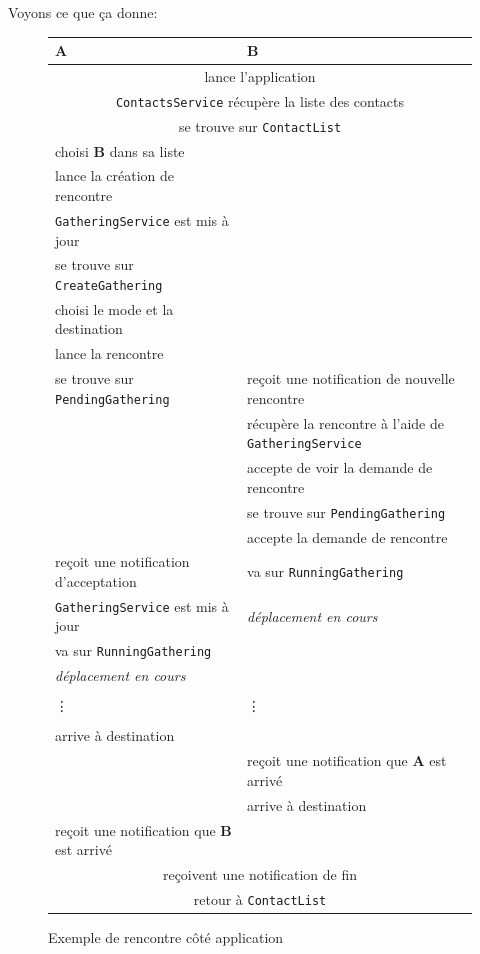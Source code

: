 \documentclass[french]{article}
\begin{document}
	Voyons ce que ça donne:
	\begin{figure}[H]
		\centering
		\begin{longtable}{|l|l|}
			\hline
			\textbf{A} & \textbf{B}\\
			\hline
			\multicolumn{2}{c}{lance l'application}\\
			\multicolumn{2}{c}{\texttt{ContactsService} récupère la liste des contacts}\\
			\multicolumn{2}{c}{se trouve sur \texttt{ContactList}}\\
			choisi \textbf{B} dans sa liste & \\
			lance la création de rencontre & \\
			\texttt{GatheringService} est mis à jour & \\
			se trouve sur \texttt{CreateGathering} & \\
			choisi le mode et la destination & \\
			lance la rencontre & \\
			se trouve sur \texttt{PendingGathering} & reçoit une notification de nouvelle rencontre\\
			& récupère la rencontre à l'aide de \texttt{GatheringService}\\
			& accepte de voir la demande de rencontre\\
			& se trouve sur \texttt{PendingGathering}\\
			& accepte la demande de rencontre\\
			reçoit une notification d'acceptation & va sur \texttt{RunningGathering}\\
			\texttt{GatheringService} est mis à jour & \textit{déplacement en cours}\\
			va sur \texttt{RunningGathering} & \\
			\textit{déplacement en cours} & \\
			&\\
			\vdots & \vdots\\
			&\\
			arrive à destination & \\
			& reçoit une notification que \textbf{A} est arrivé\\
			& arrive à destination\\
			reçoit une notification que \textbf{B} est arrivé & \\
			\multicolumn{2}{c}{reçoivent une notification de fin}\\
			\multicolumn{2}{c}{retour à \texttt{ContactList}}\\
			\hline
		\end{longtable}
		\caption{Exemple de rencontre côté application}
	\end{figure}
\end{document}
